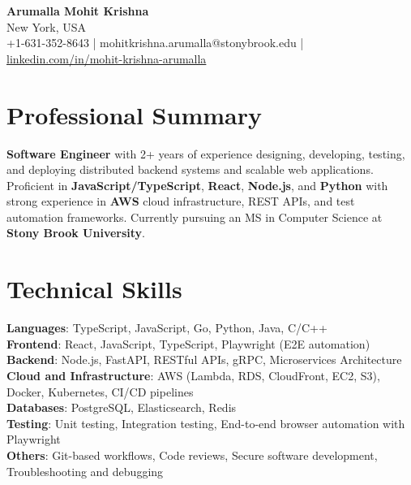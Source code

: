 \documentclass[letterpaper,11pt]{article}
\begin{document}
\begin{center}
  {\Large \textbf{Arumalla Mohit Krishna}} \\
  New York, USA \\
  +1-631-352-8643 \enspace | \enspace mohitkrishna.arumalla@stonybrook.edu \enspace | \enspace \href{https://www.linkedin.com/in/mohit-krishna-arumalla}{linkedin.com/in/mohit-krishna-arumalla}
\end{center}

\section{Professional Summary}
  \begin{itemize}[leftmargin=0.15in, label={}]
    \small{\item{
     \textbf{Software Engineer} with 2+ years of experience designing, developing, testing, and deploying distributed backend systems and scalable web applications. Proficient in \textbf{JavaScript/TypeScript}, \textbf{React}, \textbf{Node.js}, and \textbf{Python} with strong experience in \textbf{AWS} cloud infrastructure, REST APIs, and test automation frameworks. Currently pursuing an MS in Computer Science at \textbf{Stony Brook University}.
    }}
  \end{itemize}
\vspace{-16pt}

\section{Technical Skills}
 \begin{itemize}[leftmargin=0.15in, label={}]
    \small{\item{
     \textbf{Languages}: TypeScript, JavaScript, Go, Python, Java, C/C++ \\
     \textbf{Frontend}: React, JavaScript, TypeScript, Playwright (E2E automation) \\
     \textbf{Backend}: Node.js, FastAPI, RESTful APIs, gRPC, Microservices Architecture \\
     \textbf{Cloud and Infrastructure}: AWS (Lambda, RDS, CloudFront, EC2, S3), Docker, Kubernetes, CI/CD pipelines \\
     \textbf{Databases}: PostgreSQL, Elasticsearch, Redis \\
     \textbf{Testing}: Unit testing, Integration testing, End-to-end browser automation with Playwright \\
     \textbf{Others}: Git-based workflows, Code reviews, Secure software development, Troubleshooting and debugging
    }}
 \end{itemize}
\vspace{-16pt}
\end{document}
